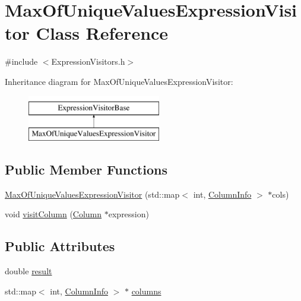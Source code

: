 \hypertarget{class_max_of_unique_values_expression_visitor}{\section{Max\+Of\+Unique\+Values\+Expression\+Visitor Class Reference}
\label{class_max_of_unique_values_expression_visitor}
}


{\ttfamily \#include $<$Expression\+Visitors.\+h$>$}

Inheritance diagram for Max\+Of\+Unique\+Values\+Expression\+Visitor\+:\begin{figure}[H]
\begin{center}
\leavevmode
\includegraphics[height=2.000000cm]{class_max_of_unique_values_expression_visitor}
\end{center}
\end{figure}
\subsection*{Public Member Functions}
\begin{DoxyCompactItemize}
\item 
\hyperlink{class_max_of_unique_values_expression_visitor_adf863a6e2406f90466e4f4decab1f4e4}{Max\+Of\+Unique\+Values\+Expression\+Visitor} (std\+::map$<$ int, \hyperlink{class_column_info}{Column\+Info} $>$ $\ast$cols)
\item 
void \hyperlink{class_max_of_unique_values_expression_visitor_a1e924d4d6d63474f401adc0c8ba6a455}{visit\+Column} (\hyperlink{class_column}{Column} $\ast$expression)
\end{DoxyCompactItemize}
\subsection*{Public Attributes}
\begin{DoxyCompactItemize}
\item 
double \hyperlink{class_max_of_unique_values_expression_visitor_a4d1359a778ac14a3709c63bff3a01383}{result}
\item 
std\+::map$<$ int, \hyperlink{class_column_info}{Column\+Info} $>$ $\ast$ \hyperlink{class_max_of_unique_values_expression_visitor_a1f0ca5cd4e5fd0eb513fa64ea21ecae6}{columns}
\end{DoxyCompactItemize}


